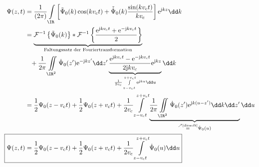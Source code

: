 		        \begin{equation}
		        	\begin{split}
		        		\Psi(z , t) & = \frac{1}{(2\pi)}\int\limits_{\IR} \left[ \tilde{\Psi}_0(k)  \cos( k v_\mathrm{c}t) + \tilde{\dot{\Psi}}_0(k) \frac{\sin( k v_\mathrm{c}t)}{ k v_\mathrm{c}} \right] \mathrm{e}^{\mathrm{j}kz } \dd k\\
		        		&=\underbrace{\mathcal{F}^{-1}\left\{ \tilde{{\Psi}}_0(k)\right\} * \mathcal{F}^{-1}\left\{ \frac{\mathrm{e}^{\mathrm{j}kv_\mathrm{c}t}+\mathrm{e}^{-\mathrm{j}kv_\mathrm{c}t}}{2}\right\}}_{\text{Faltungssatz der Fouriertransformation}}\\
		        		&\phantom{=}+\frac{1}{2\pi}\iint\limits_{\IR^2} \dot{\Psi}_0(z')\mathrm{e}^{-\mathrm{j}kz'} \dd z' \underbrace{\frac{\mathrm{e}^{\mathrm{j}kv_\mathrm{c}t}-\mathrm{e}^{-\mathrm{j}kv_\mathrm{c}t}}{2\mathrm{j}kv_\mathrm{c}}\mathrm{e}^{\mathrm{j}kz}}_{\frac{1}{2v_\mathrm{c}}\int\limits_{z-v_\mathrm{c}t}^{z+v_\mathrm{c}t}\mathrm{e}^{\mathrm{j}ku} \dd u} \dd k\\
		        		&=\frac{1}{2}\Psi_0(z-v_\mathrm{c}t)+\frac{1}{2}\Psi_0(z+v_\mathrm{c}t)+\frac{1}{2v_\mathrm{c}}\int\limits_{z-v_\mathrm{c}t}^{z+v_\mathrm{c}t} \underbrace{\frac{1}{2\pi}\iint\limits_{\IR^2} \dot{\Psi}_0(z')\mathrm{e}^{\mathrm{j}k(u-z')}\dd k \dd z'}_{\stackrel{\nearrow\text{\ref{diracft}}}{=}\dot{\Psi}_0(u)} \dd u \\
		        	\Aboxed{	\Psi(z , t)&=\frac{1}{2}\Psi_0(z-v_\mathrm{c}t)+\frac{1}{2}\Psi_0(z+v_\mathrm{c}t)+\frac{1}{2v_\mathrm{c}}\int\limits_{z-v_\mathrm{c}t}^{z+v_\mathrm{c}t} \dot{\Psi}_0(u) \dd u}
		        	\end{split}
		        \end{equation}
